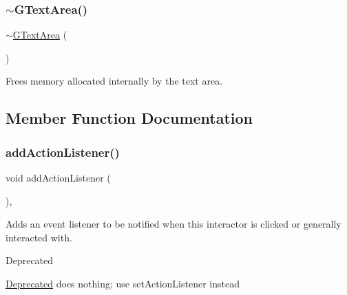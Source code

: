 \subsubsection{\texorpdfstring{$\sim$\+G\+Text\+Area()}{~GTextArea()}}
{\footnotesize\ttfamily $\sim$\mbox{\hyperlink{classsgl_1_1GTextArea}{G\+Text\+Area}} (\begin{DoxyParamCaption}{ }\end{DoxyParamCaption})\hspace{0.3cm}{\ttfamily [override]}}



Frees memory allocated internally by the text area. 



\subsection{Member Function Documentation}
\mbox{\label{classsgl_1_1GInteractor_a02f20ea6edfa0671f31c4c648a253833}} 
\subsubsection{\texorpdfstring{add\+Action\+Listener()}{addActionListener()}}
{\footnotesize\ttfamily void add\+Action\+Listener (\begin{DoxyParamCaption}{ }\end{DoxyParamCaption})\hspace{0.3cm}{\ttfamily [virtual]}, {\ttfamily [inherited]}}



Adds an event listener to be notified when this interactor is clicked or generally interacted with. 

\begin{DoxyRefDesc}{Deprecated}
\item[\mbox{\hyperlink{deprecated__deprecated000006}{Deprecated}}]does nothing; use set\+Action\+Listener instead \end{DoxyRefDesc}
\mbox{\label{classsgl_1_1GTextArea_ac7d00bfb7f87912fd664b97f29cc71e9}} 
